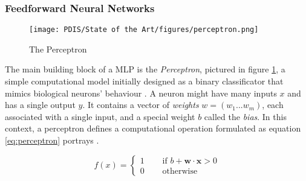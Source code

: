 \documentclass[11pt,a4paper]{article}
\begin{document}
\subsubsection{Feedforward Neural Networks}

\begin{comment}
* Explain Loss Function
* Explain gradient descent
\end{comment}

\begin{figure}
    \centering
    \texttt{[image: PDIS/State of the Art/figures/perceptron.png]}
    \caption{The Perceptron \cite{charniakIntroductionDeepLearning2018}}
    \label{fig:perceptron}
\end{figure}

The main building block of a \ac{MLP} is the \textit{Perceptron}, pictured in figure \ref{fig:perceptron}, a simple computational model initially designed as a binary classificator that mimics biological neurons' behaviour \cite{charniakIntroductionDeepLearning2018}. A neuron might have many inputs $x$ and has a single output $y$. It contains a vector of \textit{weights} $w = (w_1 ... w_m)$, each associated with a single input, and a special weight $b$ called the \textit{bias}. In this context, a perceptron defines a computational operation formulated as equation \ref{eq:perceptron} portrays \cite{charniakIntroductionDeepLearning2018}. \par

\begin{equation}\label{eq:perceptron}
f(x) =
\left\{ \begin{aligned} 
                    1 &\quad \text{ if } b + \textbf{w} \cdot \textbf{x} > 0\\
                    0 &\quad \text{ otherwise} 
                    \end{aligned} \right.
\end{equation}
\end{document}
